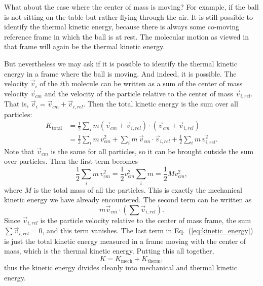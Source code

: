 What about the case where the center of mass is moving?  For example,
if the ball is not sitting on the table but rather flying through the
air.  It is still possible to identify the thermal kinetic energy,
because there is always some co-moving reference frame in which the
ball is at rest.  The molecular motion as viewed in that
frame will again be the thermal kinetic energy.

But nevertheless we may ask if
it is possible to identify the thermal kinetic energy in a frame where
the ball is moving.  And indeed, it is possible.  The velocity $\vec
v_i$ of the $i$th molecule can be written as a sum of the center of
mass velocity $\vec v_{cm}$ and the velocity of the particle relative
to the center of mass $\vec v_{i,rel}$.  That is, $\vec v_i = \vec
v_{cm} + \vec v_{i,rel}$.  Then the total kinetic energy is the sum
over all particles:
\begin{align}
K_\text{total} &=
{\textstyle\frac{1}{2}}\sum_i m (\vec v_{cm}+\vec v_{i,rel})\cdot  
(\vec v_{cm}+\vec v_{i,rel}) \nonumber\\
&= {\textstyle\frac{1}{2}}\sum_i m\, v_{cm}^2 
+\sum_i m\,\vec v_{cm}\cdot \vec v_{i,rel}
+ {\textstyle\frac{1}{2}}\sum_i m\, v_{i,rel}^2.
\label{eq:kinetic_energy}
\end{align}
Note that $\vec v_{cm}$ is the same for all particles, so it can be
brought outside the sum over particles.  Then the first term becomes
\begin{equation}
{\textstyle\frac{1}{2}}\sum_i m\, v_{cm}^2  = {\textstyle\frac{1}{2}}v_{cm}^2
\sum_i m = {\textstyle\frac{1}{2}}Mv_{cm}^2,
\end{equation}
where $M$ is the total mass of all the particles.  This is exactly the
mechanical kinetic energy we have already encountered.  The second
term can be written as
\begin{equation}
m\vec v_{cm} \cdot \left( \sum \vec v_{i,rel}\right). 
\end{equation}
Since $\vec v_{i,rel}$ is the particle velocity relative to the center
of mass frame, the sum $\sum \vec v_{i,rel}=0$, and this term
vanishes.  The last term in Eq.~(\ref{eq:kinetic_energy}) is just the
total kinetic energy measured in a frame moving with the center of
mass, which is the thermal kinetic energy.  Putting this all together,
\begin{equation}
K = K_\text{mech} + K_\text{therm},
\end{equation}
thus the kinetic energy divides cleanly into mechanical and thermal
kinetic energy.

